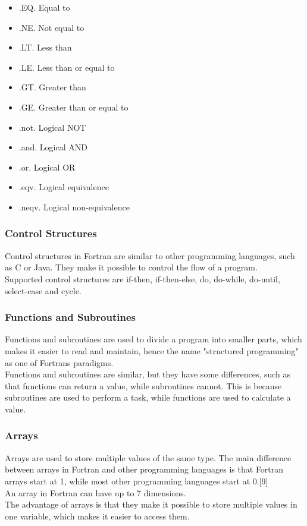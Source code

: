 \documentclass[12pt,a4paper]{scrartcl}
\begin{document}
\begin{itemize}
\item .EQ. Equal to
\item .NE. Not equal to
\item .LT. Less than
\item .LE. Less than or equal to
\item .GT. Greater than
\item .GE. Greater than or equal to
\end{itemize}

\begin{itemize}
\item .not. Logical NOT
\item .and. Logical AND
\item .or. Logical OR
\item .eqv. Logical equivalence
\item .neqv. Logical non-equivalence
\end{itemize}

\subsubsection{Control Structures}
Control structures in Fortran are similar to other programming languages, such as C or Java. They make it possible to control the flow of a program.\\
Supported control structures are if-then, if-then-else, do, do-while, do-until, select-case and cycle.\\


\subsubsection{Functions and Subroutines}
Functions and subroutines are used to divide a program into smaller parts, which makes it easier to read and maintain, hence the name "structured programming" as one of Fortrans paradigms.\\
Functions and subroutines are similar, but they have some differences, such as that functions can return a value, while subroutines cannot. This is because subroutines are used to perform a task, while functions are used to calculate a value.\\

\subsubsection{Arrays}
Arrays are used to store multiple values of the same type. The main difference between arrays in Fortran and other programming languages is that Fortran arrays start at 1, while most other programming languages start at 0.[9]\\
An array in Fortran can have up to 7 dimensions.\\
The advantage of arrays is that they make it possible to store multiple values in one variable, which makes it easier to access them.\\
\end{document}
